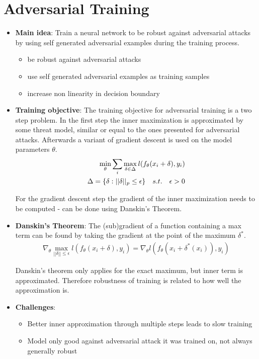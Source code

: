 \documentclass[conference]{IEEEtran}
\begin{document}
\section{Adversarial Training}
\begin{itemize}
  \item \textbf{Main idea}: Train a neural network to be robust against adversarial attacks by using self generated adversarial examples during the training process.\\

  \begin{itemize}
    \item be robust against adversarial attacks
    \item use self generated adversarial examples as training samples
    \item increase non linearity in decision boundary \\
  \end{itemize} 
  
  \item \textbf{Training objective}: The training objective for adversarial training is a two step problem. In the first step the inner maximization is approximated by some threat model, similar or equal to the ones presented for adversarial attacks. Afterwards a variant of gradient descent is used on the model parameters $\theta$. \\
  \begin{align*}
    \min_{\theta} \sum_i \max_{\delta \in \Delta} \space l(f_{\theta}(x_i + \delta), y_i)  \\
  \Delta = \{\delta : ||\delta||_p \leq \epsilon\} \quad s.t. \quad \epsilon > 0 \\
  \end{align*}

  For the gradient descent step the gradient of the inner maximization needs to be computed - can be done using Danskin's Theorem. \\

  \item \textbf{Danskin's Theorem}: The (sub)gradient of a function containing a max term can be found by taking the gradient at the point of the maximum $\delta^{*}$.
  \begin{align*}
    \nabla_{\theta} \max_{||\delta|| \leq \epsilon} l(f_{\theta}(x_i + \delta), y_i) = \nabla_{\theta} l(f_{\theta}(x_i + \delta^{*}(x_i)), y_i)
  \end{align*}

  Danskin's theorem only applies for the exact maximum, but inner term is approximated. Therefore robustness of training is related to how well the approximation is. \\

  \item \textbf{Challenges}: 
  \begin{itemize}
    \item Better inner approximation through multiple steps leads to slow training
    \item Model only good against adversarial attack it was trained on, not always generally robust
  \end{itemize}
\end{itemize}
\end{document}

